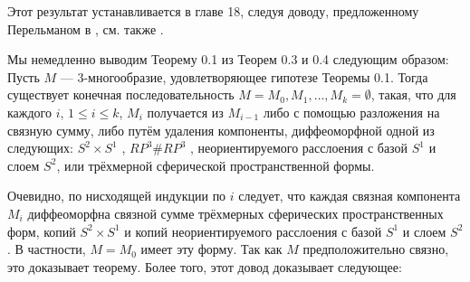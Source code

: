 Этот результат устанавливается в главе 18, следуя доводу, предложенному Перельманом 
в \cite{c54}, см. также \cite{c15}.

Мы немедленно выводим Теорему 0.1 из Теорем 0.3 и 0.4 следующим образом:
Пусть $M$ — 3-многообразие, удовлетворяющее гипотезе Теоремы 0.1. Тогда 
существует конечная последовательность $M=M_{0},M_{1},\ldots ,M_{k}=\emptyset $, такая, что для 
каждого $i$, $1\leq i\leq k$, $M_{i}$ получается из $M_{i-1}$ либо с помощью разложения на связную 
сумму, либо путём удаления компоненты, диффеоморфной одной из следующих: 
$S^{2}\times S^{1}$ , $RP^{3} \# RP^{3}$ , неориентируемого расслоения с базой $S^{1}$ и слоем 
$S^{2}$, или трёхмерной сферической пространственной формы.

Очевидно, по нисходящей индукции по $i$ следует, что каждая связная компонента 
$M_{i}$ диффеоморфна связной сумме трёхмерных сферических пространственных форм, 
копий $S^{2} \times S^{1}$ и копий неориентируемого расслоения с базой $S^{1}$ и слоем 
$S^{2}$. В частности, $M=M_{0}$ имеет эту форму. Так как $M$ предположительно связно, 
это доказывает теорему. Более того, этот довод доказывает следующее: